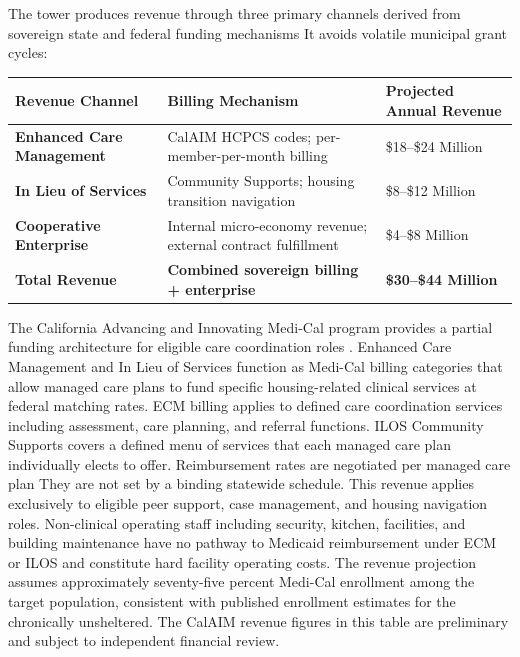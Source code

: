 \documentclass[12pt, letterpaper]{article}
\begin{document}
The tower produces revenue through three primary channels derived from sovereign state and federal funding mechanisms It avoids volatile municipal grant cycles:

\begin{table}[H]
\centering
\begin{tabularx}{\textwidth}{@{}lXX@{}}
\toprule
\textbf{Revenue Channel} & \textbf{Billing Mechanism} & \textbf{Projected Annual Revenue} \\
\midrule
\textbf{Enhanced Care Management} & CalAIM HCPCS codes; per-member-per-month billing & \$18--\$24 Million \\
\textbf{In Lieu of Services} & Community Supports; housing transition navigation & \$8--\$12 Million \\
\textbf{Cooperative Enterprise} & Internal micro-economy revenue; external contract fulfillment & \$4--\$8 Million \\
\textbf{Total Revenue} & \textbf{Combined sovereign billing + enterprise} & \textbf{\$30--\$44 Million} \\
\bottomrule
\end{tabularx}
\end{table}

The California Advancing and Innovating Medi-Cal program provides a partial funding architecture for eligible care coordination roles \citep{dhcs_calaim_2024}. Enhanced Care Management and In Lieu of Services function as Medi-Cal billing categories that allow managed care plans to fund specific housing-related clinical services at federal matching rates. ECM billing applies to defined care coordination services including assessment, care planning, and referral functions. ILOS Community Supports covers a defined menu of services that each managed care plan individually elects to offer. Reimbursement rates are negotiated per managed care plan They are not set by a binding statewide schedule. This revenue applies exclusively to eligible peer support, case management, and housing navigation roles. Non-clinical operating staff including security, kitchen, facilities, and building maintenance have no pathway to Medicaid reimbursement under ECM or ILOS and constitute hard facility operating costs. The revenue projection assumes approximately seventy-five percent Medi-Cal enrollment among the target population, consistent with published enrollment estimates for the chronically unsheltered. The CalAIM revenue figures in this table are preliminary and subject to independent financial review.
\end{document}
